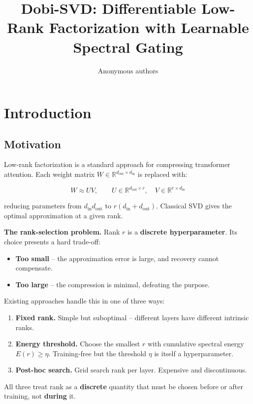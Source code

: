 \title{\textbf{Dobi-SVD: Differentiable Low-Rank Factorization with Learnable Spectral Gating}}

\author{Anonymous authors}



\section{Introduction}

\subsection{Motivation}

Low-rank factorization is a standard approach for compressing transformer 
attention. Each weight matrix $W \in \mathbb{R}^{d_\text{out} \times d_\text{in}}$ 
is replaced with:

\[
W \approx U V, \qquad
U \in \mathbb{R}^{d_\text{out} \times r}, \quad
V \in \mathbb{R}^{r \times d_\text{in}}
\tag{1.1}
\]

reducing parameters from $d_\text{in} d_\text{out}$ to $r(d_\text{in} + d_\text{out})$. 
Classical SVD gives the optimal approximation at a given rank.

\textbf{The rank-selection problem.} Rank $r$ is a \textbf{discrete hyperparameter}. 
Its choice presents a hard trade-off:

\begin{itemize}
\item \textbf{Too small} -- the approximation error is large, and recovery cannot
  compensate.
\item \textbf{Too large} -- the compression is minimal, defeating the purpose.

\end{itemize}
Existing approaches handle this in one of three ways:

\begin{enumerate}
\item \textbf{Fixed rank.} Simple but suboptimal -- different layers have different
  intrinsic ranks.
\item \textbf{Energy threshold.} Choose the smallest $r$ with cumulative spectral
  energy $E(r) \geq \eta$. Training-free but the threshold $\eta$ is
  itself a hyperparameter.
\item \textbf{Post-hoc search.} Grid search rank per layer. Expensive and
  discontinuous.

\end{enumerate}
All three treat rank as a \textbf{discrete} quantity that must be chosen before 
or after training, not \textbf{during} it.

